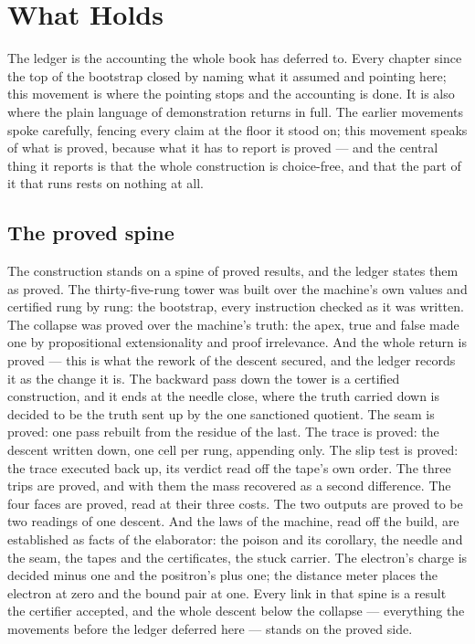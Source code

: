 \chapter{What Holds}
\label{chap:what-holds}

The ledger is the accounting the whole book has deferred to. Every chapter since the top of the bootstrap
closed by naming what it assumed and pointing here; this movement is where the pointing stops and the
accounting is done. It is also where the plain language of demonstration returns in full. The earlier
movements spoke carefully, fencing every claim at the floor it stood on; this movement speaks of what is
proved, because what it has to report is proved --- and the central thing it reports is that the whole
construction is choice-free, and that the part of it that runs rests on nothing at all.

\section{The proved spine}
\label{se:the-proved-spine}

The construction stands on a spine of proved results, and the ledger states them as proved. The
thirty-five-rung tower was built over the machine's own values and certified rung by rung: the bootstrap,
every instruction checked as it was written. The collapse was proved over the machine's truth: the apex,
true and false made one by propositional extensionality and proof irrelevance. And the whole return is
proved --- this is what the rework of the descent secured, and the ledger records it as the change it is.
The backward pass down the tower is a certified construction, and it ends at the needle close, where the
truth carried down is decided to be the truth sent up by the one sanctioned quotient. The seam is proved:
one pass rebuilt from the residue of the last. The trace is proved: the descent written down, one cell per
rung, appending only. The slip test is proved: the trace executed back up, its verdict read off the tape's
own order. The three trips are proved, and with them the mass recovered as a second difference. The four
faces are proved, read at their three costs. The two outputs are proved to be two readings of one descent.
And the laws of the machine, read off the build, are established as facts of the elaborator: the poison and
its corollary, the needle and the seam, the tapes and the certificates, the stuck carrier. The electron's
charge is decided minus one and the positron's plus one; the distance meter places the electron at zero and
the bound pair at one. Every link in that spine is a result the certifier accepted, and the whole
descent below the collapse --- everything the movements before the ledger deferred here --- stands on the
proved side.

